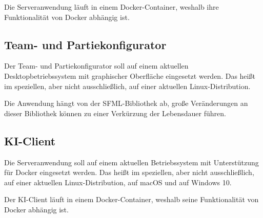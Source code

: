 Die Serveranwendung läuft in einem Docker-Container, weshalb ihre Funktionalität von Docker abhängig ist.

\subsection{Team- und Partiekonfigurator}
Der Team- und Partiekonfigurator soll auf einem aktuellen Desktopbetriebssystem mit graphischer Oberfläche eingesetzt werden. Das heißt im speziellen, aber nicht ausschließlich, auf einer aktuellen Linux-Distribution.

Die Anwendung hängt von der SFML-Bibliothek ab, große Veränderungen an dieser Bibliothek können zu einer Verkürzung der Lebensdauer führen.

\subsection{KI-Client}
Die Serveranwendung soll auf einem aktuellen Betriebssystem mit Unterstützung für Docker eingesetzt werden. Das heißt im speziellen, aber nicht ausschließlich, auf einer aktuellen Linux-Distribution, auf macOS und auf Windows 10.

Der KI-Client läuft in einem Docker-Container, weshalb seine Funktionalität von Docker abhängig ist.
